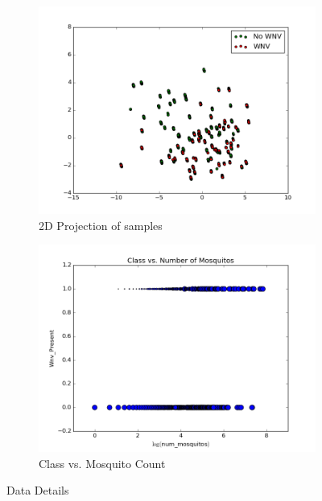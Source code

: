 \documentclass{article} %
\begin{document}
\begin{figure}
\centering
\begin{subfigure}[b]{.48\linewidth}
\includegraphics[width=\linewidth]{"img/pca"}
\caption{2D Projection of samples}
\label{img:pca}
\end{subfigure}
\begin{subfigure}[b]{.48\linewidth}
\includegraphics[width=\linewidth]{"img/class-descr"}
\caption{Class vs. Mosquito Count}
\label{img:classcount}
\end{subfigure}
\caption{Data Details}
\end{figure}

\end{document}

